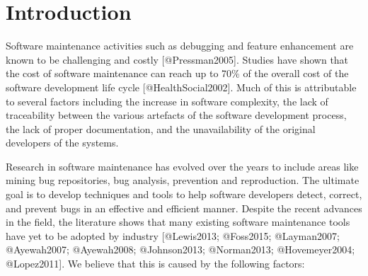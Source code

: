 \section{Introduction}\label{introduction}

Software maintenance activities such as debugging and feature
enhancement are known to be challenging and costly {[}@Pressman2005{]}.
Studies have shown that the cost of software maintenance can reach up to
70\% of the overall cost of the software development life cycle
{[}@HealthSocial2002{]}. Much of this is attributable to several factors
including the increase in software complexity, the lack of traceability
between the various artefacts of the software development process, the
lack of proper documentation, and the unavailability of the original
developers of the systems.

Research in software maintenance has evolved over the years to include
areas like mining bug repositories, bug analysis, prevention and
reproduction. The ultimate goal is to develop techniques and tools to
help software developers detect, correct, and prevent bugs in an
effective and efficient manner. Despite the recent advances in the
field, the literature shows that many existing software maintenance
tools have yet to be adopted by industry {[}@Lewis2013; @Foss2015;
@Layman2007; @Ayewah2007; @Ayewah2008; @Johnson2013; @Norman2013;
@Hovemeyer2004; @Lopez2011{]}. We believe that this is caused by the
following factors:

